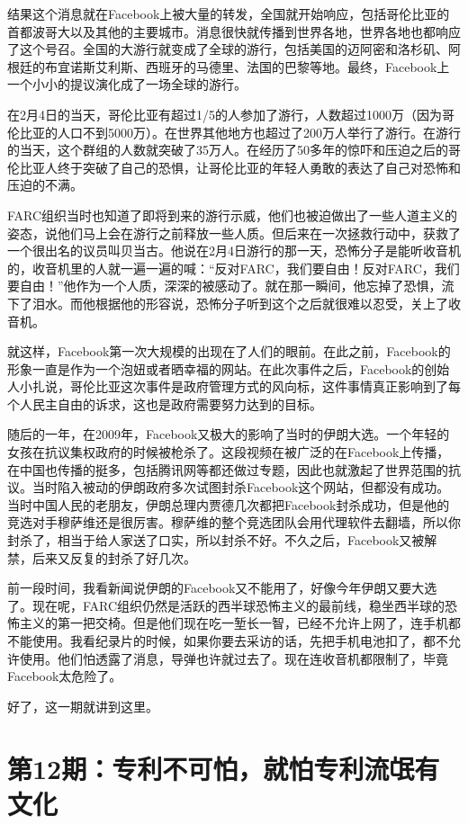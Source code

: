 \documentclass[
  letterpaper,
  DIV=11,
  numbers=noendperiod]{scrreprt}
\begin{document}
结果这个消息就在Facebook上被大量的转发，全国就开始响应，包括哥伦比亚的首都波哥大以及其他的主要城市。消息很快就传播到世界各地，世界各地也都响应了这个号召。全国的大游行就变成了全球的游行，包括美国的迈阿密和洛杉矶、阿根廷的布宜诺斯艾利斯、西班牙的马德里、法国的巴黎等地。最终，Facebook上一个小小的提议演化成了一场全球的游行。

在2月4日的当天，哥伦比亚有超过1/5的人参加了游行，人数超过1000万（因为哥伦比亚的人口不到5000万）。在世界其他地方也超过了200万人举行了游行。在游行的当天，这个群组的人数就突破了35万人。在经历了50多年的惊吓和压迫之后的哥伦比亚人终于突破了自己的恐惧，让哥伦比亚的年轻人勇敢的表达了自己对恐怖和压迫的不满。

FARC组织当时也知道了即将到来的游行示威，他们也被迫做出了一些人道主义的姿态，说他们马上会在游行之前释放一些人质。但后来在一次拯救行动中，获救了一个很出名的议员叫贝当古。他说在2月4日游行的那一天，恐怖分子是能听收音机的，收音机里的人就一遍一遍的喊：``反对FARC，我们要自由！反对FARC，我们要自由！''他作为一个人质，深深的被感动了。就在那一瞬间，他忘掉了恐惧，流下了泪水。而他根据他的形容说，恐怖分子听到这个之后就很难以忍受，关上了收音机。

就这样，Facebook第一次大规模的出现在了人们的眼前。在此之前，Facebook的形象一直是作为一个泡妞或者晒幸福的网站。在此次事件之后，Facebook的创始人小扎说，哥伦比亚这次事件是政府管理方式的风向标，这件事情真正影响到了每个人民主自由的诉求，这也是政府需要努力达到的目标。

随后的一年，在2009年，Facebook又极大的影响了当时的伊朗大选。一个年轻的女孩在抗议集权政府的时候被枪杀了。这段视频在被广泛的在Facebook上传播，在中国也传播的挺多，包括腾讯网等都还做过专题，因此也就激起了世界范围的抗议。当时陷入被动的伊朗政府多次试图封杀Facebook这个网站，但都没有成功。当时中国人民的老朋友，伊朗总理内贾德几次都把Facebook封杀成功，但是他的竞选对手穆萨维还是很厉害。穆萨维的整个竞选团队会用代理软件去翻墙，所以你封杀了，相当于给人家送了口实，所以封杀不好。不久之后，Facebook又被解禁，后来又反复的封杀了好几次。

前一段时间，我看新闻说伊朗的Facebook又不能用了，好像今年伊朗又要大选了。现在呢，FARC组织仍然是活跃的西半球恐怖主义的最前线，稳坐西半球的恐怖主义的第一把交椅。但是他们现在吃一堑长一智，已经不允许上网了，连手机都不能使用。我看纪录片的时候，如果你要去采访的话，先把手机电池扣了，都不允许使用。他们怕透露了消息，导弹也许就过去了。现在连收音机都限制了，毕竟Facebook太危险了。

好了，这一期就讲到这里。


\chapter{第12期：专利不可怕，就怕专利流氓有文化}\label{ux7b2c12ux671fux4e13ux5229ux4e0dux53efux6015ux5c31ux6015ux4e13ux5229ux6d41ux6c13ux6709ux6587ux5316}
\end{document}
